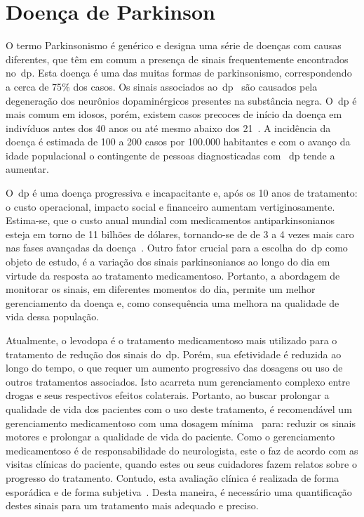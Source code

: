 \section{Doença de Parkinson}\label{section:doenca_parkinson}
O termo Parkinsonismo é genérico e designa uma série de doenças com causas diferentes, que têm em comum a presença de sinais frequentemente encontrados no~\ac{dp}. Esta doença é uma das muitas formas de parkinsonismo, correspondendo a cerca de 75$\%$ dos casos. Os sinais associados ao~\ac{dp}~\cite{protpar010} são causados pela degeneração dos neurônios dopaminérgicos presentes na substância negra. O~\ac{dp} é mais comum em idosos, porém, existem casos precoces de início da doença em indivíduos antes dos 40 anos ou até mesmo abaixo dos 21~\cite{menezes2003}. A incidência da doença é estimada de 100 a 200 casos por 100.000 habitantes e com o avanço da idade populacional o contingente de pessoas diagnosticadas com ~\ac{dp} tende a aumentar.

O~\ac{dp} é uma doença progressiva e incapacitante e, após os 10 anos de tratamento: o custo operacional, impacto social e financeiro aumentam vertiginosamente. Estima-se, que o custo anual mundial com medicamentos antiparkinsonianos esteja em torno de 11 bilhões de dólares, tornando-se de de 3 a 4 vezes mais caro nas fases avançadas da doença~\cite{protpar010}. Outro fator crucial para a escolha do~\ac{dp} como objeto de estudo, é a variação dos sinais parkinsonianos ao longo do dia em virtude da resposta ao tratamento medicamentoso. Portanto, a abordagem de monitorar os sinais, em diferentes momentos do dia, permite um melhor gerenciamento da doença e, como consequência uma melhora na qualidade de vida dessa população.


Atualmente, o levodopa é o tratamento medicamentoso mais utilizado para o tratamento de redução dos sinais do~\ac{dp}. Porém, sua efetividade é reduzida ao longo do tempo, o que requer um aumento progressivo das dosagens ou uso de outros tratamentos associados. Isto acarreta num gerenciamento complexo entre drogas e seus respectivos efeitos colaterais. Portanto, ao buscar prolongar a qualidade de vida dos pacientes com o uso deste tratamento, é recomendável um gerenciamento medicamentoso com uma dosagem mínima~\cite{national2006parkinson} para: reduzir os sinais motores e prolongar a qualidade de vida do paciente. Como o gerenciamento medicamentoso é de responsabilidade do neurologista, este o faz de acordo com as visitas clínicas do paciente, quando estes ou seus cuidadores fazem relatos sobre o progresso do tratamento. Contudo, esta avaliação clínica é realizada de forma esporádica e de forma subjetiva~\cite{protpar010,quantitativeparkinson2011}. Desta maneira, é necessário uma quantificação destes sinais 
para um tratamento mais adequado e preciso. 

